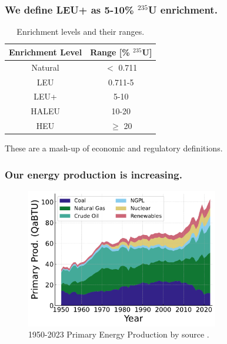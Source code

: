 \documentclass[9pt]{beamer}
\begin{document}
  \begin{frame}
    \frametitle{We define LEU+ as 5-10\% $^{235}$U enrichment.}
    \begin{table}[H]
        \centering
        \caption{Enrichment levels and their ranges.}
        \label{tab:enrichment_levels}
        \begin{tabular}{c c}
           \hline
           \textbf{Enrichment Level} & \textbf{Range [\%  $^{235}$U]} \\
           \hline
           Natural & $<$ 0.711 \\
           LEU & 0.711-5 \\
           LEU+ & 5-10 \\
           HALEU & 10-20 \\
           HEU & $\geq$ 20  \\
           \hline
        \end{tabular}
     \end{table}
     These are a mash-up of economic and regulatory definitions.
  \end{frame}

  \begin{frame}
    \frametitle{Our energy production is increasing.}
    \begin{figure}
        \centering
        \includegraphics[width=0.75\textwidth]{images/prim_prod_b_source.pdf}
        \caption{1950-2023 Primary Energy Production by source \cite{mer_april_2024}.}
    \end{figure}
  \end{frame}
\end{document}
